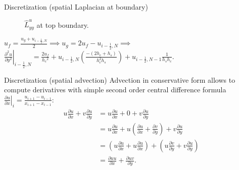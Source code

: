 \documentclass{beamer}
\begin{document}
	\begin{frame}{Discretization (spatial Laplacian at boundary)}
	\begin{figure}[H]
	  \caption{$\hat{L}^u_{yy}$ at top boundary.}\label{fig:luxx-top}
	\end{figure}	
	$u_{f} = \frac{u_g+u_{i-\frac{1}{2},N}}{2}\implies u_g=2u_{f}-u_{i-\frac{1}{2},N}\implies$
	$\left.\frac{\partial^2 u}{\partial y^2}\right|_{i-\frac{1}{2},N}=\frac{2 u_f}{h_c{ }^2}+u_{i-\frac{1}{2},N}\left(\frac{-\left(2 h_c+h_s\right)}{h_c^2 h_s}\right)+u_{i-\frac{1}{2},N-1} \frac{1}{h_s h_c}.$
	\end{frame}
	
	\begin{frame}{Discretization (spatial advection)}
	Advection in conservative form allows to compute derivatives with simple second order central difference formula $\left.\frac{\partial u}{\partial x}\right|_{i}=\frac{u_{i+1}-u_{i-1}}{x_{i+1}-x_{i-1}}$:
		\begin{align}\label{eqn:advection-conservative}
		u\frac{\partial u}{\partial x}+v \frac{\partial u}{\partial y}
		&=u\frac{\partial u}{\partial x}+0+v \frac{\partial u}{\partial y}\nonumber\\
		&= u\frac{\partial u}{\partial x}+ u\left(\frac{\partial u}{\partial x} +\frac{\partial v}{\partial y}\right ) +v \frac{\partial u}{\partial y}\nonumber\\
		&=\left(u\frac{\partial u}{\partial x}+ u\frac{\partial u}{\partial x}\right ) +\left(u\frac{\partial v}{\partial y} +v \frac{\partial u}{\partial y}\right )\nonumber\\
		&=\frac{\partial uu}{\partial x}+ \frac{\partial uv}{\partial y}.
	\end{align}
	
	\end{frame}
\end{document}
